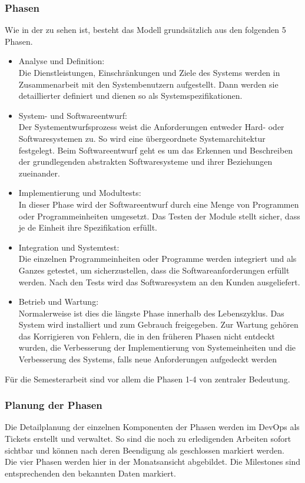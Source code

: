\subsubsection{Phasen}
Wie in der  zu sehen ist, besteht das Modell grundsätzlich aus den folgenden 5 Phasen.
  \begin{itemize}
      \item Analyse und Definition:\\
      Die Dienstleistungen, Einschränkungen und Ziele des Systems werden in Zusammenarbeit mit den Systembenutzern aufgestellt. Dann werden sie detaillierter  definiert und dienen so als Systemspezifikationen. 
      \item System- und Softwareentwurf:\\  Der Systementwurfsprozess weist die Anforderungen entweder Hard- oder Softwaresystemen zu. So wird eine übergeordnete Systemarchitektur festgelegt. Beim Softwareentwurf geht es um das Erkennen und Beschreiben der grundlegenden abstrakten Softwaresysteme und ihrer Beziehungen zueinander. 
      \item Implementierung und Modultests:\\  In dieser Phase wird der Softwareentwurf durch eine Menge von Programmen oder Programmeinheiten umgesetzt. Das Testen der Module stellt sicher, dass je de Einheit ihre Spezifikation erfüllt.
      \item Integration und Systemtest:\\  Die einzelnen Programmeinheiten oder Programme werden integriert und als Ganzes getestet, um sicherzustellen, dass die Softwareanforderungen erfüllt werden. Nach den Tests wird das Softwaresystem an den Kunden ausgeliefert.
      \item Betrieb und Wartung:\\ Normalerweise ist dies die längste Phase innerhalb des Lebenszyklus. Das System wird installiert und zum Gebrauch freigegeben. Zur Wartung gehören das Korrigieren von Fehlern,  die in den früheren Phasen nicht entdeckt wurden, die Verbesserung der Implementierung von Systemeinheiten und die Verbesserung des Systems, falls neue Anforderungen aufgedeckt werden
  \end{itemize}

Für die Semesterarbeit sind vor allem die Phasen 1-4 von zentraler Bedeutung.
\newpage
\subsubsection{Planung der Phasen}
Die Detailplanung der einzelnen Komponenten der Phasen werden im DevOps als Tickets erstellt und verwaltet. So sind die noch zu erledigenden Arbeiten sofort sichtbar und können nach deren Beendigung als geschlossen markiert werden.\\
Die vier Phasen werden hier in der Monatsansicht abgebildet. Die Milestones sind entsprechenden den bekannten Daten markiert.

